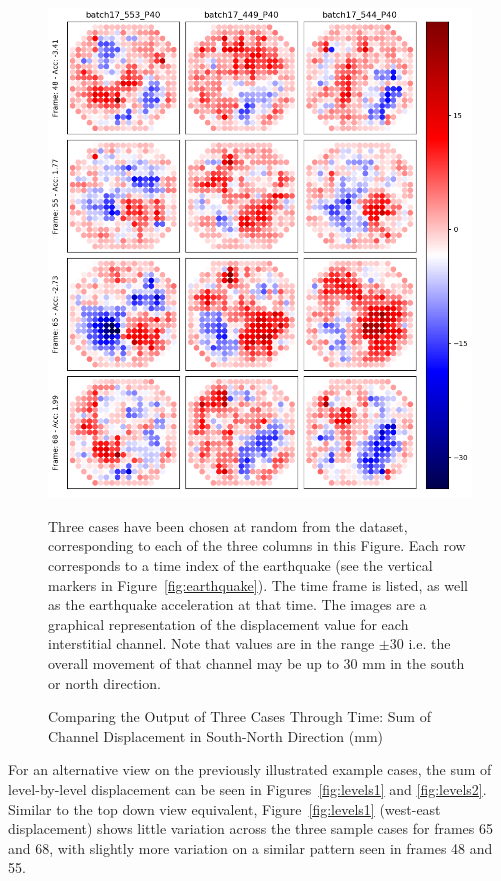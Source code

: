 \begin{figure}[p]
	\centering
	\includegraphics[scale=0.45]{Figures/results2.png}
	\caption{Comparing the Output of Three Cases Through Time: Sum of Channel Displacement in South-North Direction (mm) } {Three cases have been chosen at random from the dataset, corresponding to each of the three columns in this Figure. Each row corresponds to a time index of the earthquake (see the vertical markers in Figure~\ref{fig:earthquake}). The time frame is listed, as well as the earthquake acceleration at that time. The images are a graphical representation of the displacement value for each interstitial channel. Note that values are in the range $ \pm 30 $ i.e. the overall movement of that channel may be up to 30 mm in the south or north direction.}
	\label{fig:results2}
\end{figure}

\noindent
For an alternative view on the previously illustrated example cases, the sum of level-by-level displacement can be seen in Figures~\ref{fig:levels1} and \ref{fig:levels2}. Similar to the top down view equivalent, Figure~\ref{fig:levels1} (west-east displacement) shows little variation across the three sample cases for frames 65 and 68, with slightly more variation on a similar pattern seen in frames 48 and 55. 
\\

